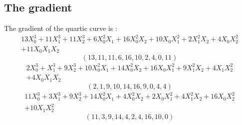 \documentclass{article}
\begin{document}
{\subsection*{The gradient}
The gradient of the quartic curve  is :
$$
\begin{array}{c}
13X_0^3 + 11X_1^3 + 11X_2^3 + 6X_0^2X_1 + 16X_0^2X_2 + 10X_0X_1^2 + 2X_1^2X_2 + 4X_0X_2^2\\
 + 11X_0X_1X_2\end{array}
$$
$$
( 13, 11, 11, 6, 16, 10, 2, 4, 0, 11 )$$
$$
\begin{array}{c}
2X_0^3 + X_1^3 + 9X_2^3 + 10X_0^2X_1 + 14X_0^2X_2 + 16X_0X_1^2 + 9X_1^2X_2 + 4X_1X_2^2\\
 + 4X_0X_1X_2\end{array}
$$
$$
( 2, 1, 9, 10, 14, 16, 9, 0, 4, 4 )$$
$$
\begin{array}{c}
11X_0^3 + 3X_1^3 + 9X_2^3 + 14X_0^2X_1 + 4X_0^2X_2 + 2X_0X_1^2 + 4X_1^2X_2 + 16X_0X_2^2\\
 + 10X_1X_2^2\end{array}
$$
$$
( 11, 3, 9, 14, 4, 2, 4, 16, 10, 0 )$$


%


%


}%
\end{document}
